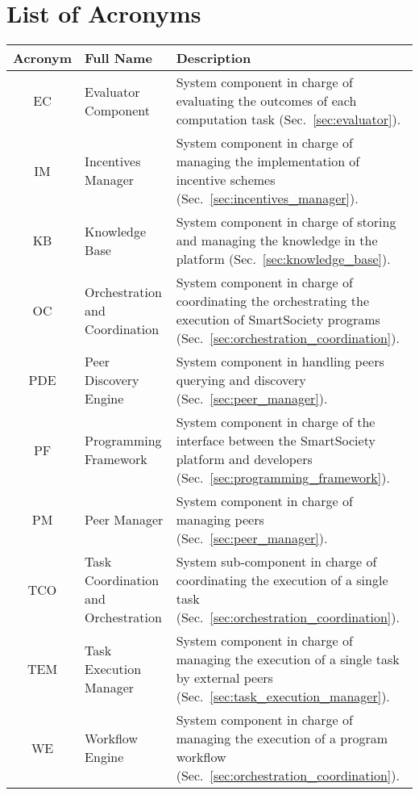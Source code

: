 \documentclass{SmartReport}
\begin{document}
\section*{List of Acronyms}
\begin{tabular}{|c|p{3cm}|p{10cm}|}
\hline 
\textbf{Acronym} & \textbf{Full Name} & \textbf{Description} \\
\hline 
\hline 
EC & Evaluator Component & System component in charge of evaluating the outcomes of each computation task (Sec.~\ref{sec:evaluator}).\\
\hline 
IM & Incentives Manager & System component in charge of managing the implementation of incentive schemes (Sec.~\ref{sec:incentives_manager}).\\  
\hline 
KB & Knowledge Base &  System component in charge of storing and managing the knowledge in the platform (Sec.~\ref{sec:knowledge_base}).\\
\hline
OC & Orchestration and Coordination &  System component in charge of coordinating the orchestrating the execution of SmartSociety programs (Sec.~\ref{sec:orchestration_coordination}).\\ 
\hline 
PDE & Peer Discovery Engine &  System component in handling peers querying and discovery (Sec.~\ref{sec:peer_manager}).\\ 
\hline  
PF & Programming Framework &  System component in charge of the interface between the SmartSociety platform and developers (Sec.~\ref{sec:programming_framework}).\\
\hline 
PM & Peer Manager &  System component in charge of managing peers  (Sec.~\ref{sec:peer_manager}).\\
\hline
TCO & Task Coordination and Orchestration &  System sub-component in charge of coordinating the execution of a single task (Sec.~\ref{sec:orchestration_coordination}).\\
\hline
TEM & Task Execution Manager &  System component in charge of managing the execution of a single task by external peers (Sec.~\ref{sec:task_execution_manager}).\\ 
\hline
WE & Workflow Engine &  System component in charge of managing the execution of a program workflow (Sec.~\ref{sec:orchestration_coordination}).\\ 
\hline  
\end{tabular}

\newpage

\end{document}
